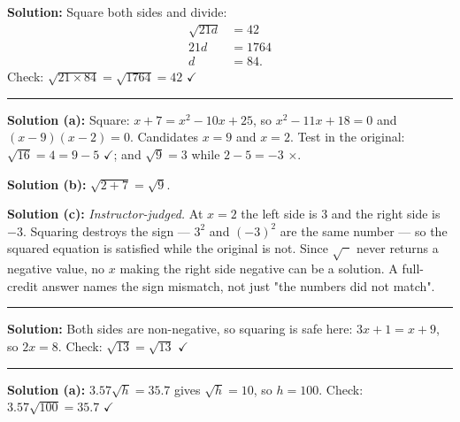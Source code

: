 \documentclass[12pt]{article}
\begin{document}

\textbf{Solution:} Square both sides and divide:
\begin{align*}
  \sqrt{21d} &= 42 \\
  21d &= 1764 \\
  d &= 84 .
\end{align*}
Check: $\sqrt{21 \times 84} = \sqrt{1764} = 42$ $\checkmark$

\vspace{0.2cm}\noindent\rule{\linewidth}{0.2pt}\vspace{0.2cm}


\textbf{Solution (a):} Square: $x + 7 = x^2 - 10x + 25$, so
$x^2 - 11x + 18 = 0$ and $(x-9)(x-2) = 0$. Candidates $x = 9$ and $x = 2$.
Test in the original: $\sqrt{16} = 4 = 9 - 5$ $\checkmark$; and
$\sqrt{9} = 3$ while $2 - 5 = -3$ $\times$. 

\textbf{Solution (b):} $\sqrt{2+7} = \sqrt{9}$. 

\textbf{Solution (c):} \emph{Instructor-judged.} At $x = 2$ the left side is $3$
and the right side is $-3$. Squaring destroys the sign --- $3^2$ and $(-3)^2$ are
the same number --- so the squared equation is satisfied while the original is
not. Since $\sqrt{\phantom{x}}$ never returns a negative value, no $x$ making the
right side negative can be a solution. A full-credit answer names the sign
mismatch, not just "the numbers did not match".

\vspace{0.2cm}\noindent\rule{\linewidth}{0.2pt}\vspace{0.2cm}


\textbf{Solution:} Both sides are non-negative, so squaring is safe here:
$3x + 1 = x + 9$, so $2x = 8$. Check: $\sqrt{13} = \sqrt{13}$ $\checkmark$

\vspace{0.2cm}\noindent\rule{\linewidth}{0.2pt}\vspace{0.2cm}


\textbf{Solution (a):} $3.57\sqrt{h} = 35.7$ gives $\sqrt{h} = 10$, so
$h = 100$. Check: $3.57\sqrt{100} = 35.7$ $\checkmark$
\end{document}
